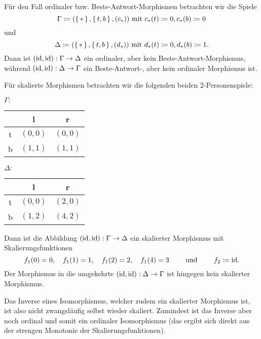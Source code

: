 \begin{bsp}
	Für den Fall ordinaler bzw. Beste-Antwort-Morphismen betrachten wir die Spiele 
		\[\Gamma \coloneqq (\set{\ast}, \set{t, b}, (c_\ast)) \text{ mit } c_\ast(t) \coloneqq 0, c_\ast(b) \coloneqq 0\]
	und 
		\[\Delta \coloneqq (\set{\ast}, \set{t, b}, (d_\ast)) \text{ mit } d_\ast(t) \coloneqq 0, d_\ast(b) \coloneqq 1.\]
	Dann ist $(\mathrm{id}, \mathrm{id}): \Gamma \to \Delta$ ein ordinaler, aber kein Beste-Antwort-Morphismus, während $(\mathrm{id}, \mathrm{id}): \Delta \to \Gamma$  ein Beste-Antwort-, aber kein ordinaler Morphismus ist.
\end{bsp}

\begin{bsp}\label{bsp:GegenbspSkalUndIsoIstSkalIso}
	Für skalierte Morphismen betrachten wir die folgenden beiden 2-Personenspiele:
	\begin{center}
		$\Gamma:$ \quad
		\begin{tabular}{c||c|c}
			& l 		& r 		\\\hline\hline
			t	& $(0,0)$	& $(0,0)$	\\\hline
			b	& $(1,1)$	& $(1,1)$ 
		\end{tabular}\hspace{5em}
		$\Delta:$ \quad
		\begin{tabular}{c||c|c}
			& l 		& r 		\\\hline\hline
			t	& $(0,0)$	& $(2,0)$	\\\hline
			b	& $(1,2)$	& $(4,2)$ 
		\end{tabular}
	\end{center}
	Dann ist die Abbildung $(\mathrm{id}, \mathrm{id}): \Gamma \to \Delta$ ein skalierter Morphismus mit Skalierungsfunktionen 
		\[f_1(0) = 0,\hspace{1em} f_1(1) = 1,\hspace{1em} f_1(2) = 2,\hspace{1em} f_1(4)=3 \qquad\text{ und }\qquad f_2 \coloneqq \mathrm{id}.\]
	Der Morphismus in die umgekehrte $(\mathrm{id}, \mathrm{id}): \Delta \to \Gamma$ ist hingegen kein skalierter Morphismus.
\end{bsp}

\begin{beob}\label{beob:InverseVonSkalMorphSindOrd}
	Das Inverse eines Isomorphismus, welcher zudem ein skalierter Morphismus ist, ist also nicht zwangsläufig selbst wieder skaliert. Zumindest ist das Inverse aber noch ordinal und somit ein ordinaler Isomorphismus (das ergibt sich direkt aus der strengen Monotonie der Skalierungsfunktionen).
\end{beob}

